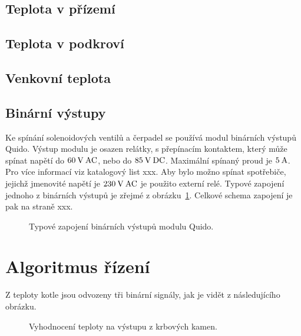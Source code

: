 \documentclass[a4paper,draft]{book}
\begin{document}
    \section{Teplota v přízemí}

    \section{Teplota v podkroví}

    \section{Venkovní teplota}

    \section{Binární výstupy}

        Ke spínání solenoidových ventilů a čerpadel se používá modul binárních
        výstupů Quido. Výstup modulu je
        osazen relátky, s přepínacím kontaktem, který může spínat napětí do
        $60\rm\:V\:AC$, nebo do $85\rm\:V\:DC$. Maximální spínaný proud je
        $5\rm\:A$. Pro více informací viz katalogový list xxx. Aby bylo možno
        spínat spotřebiče, jejichž jmenovité napětí je $230\rm\:V\:AC$ je
        použito externí relé. Typové zapojení jednoho z binárních výstupů je
        zřejmé z obrázku~\ref{fig:binary-out}. Celkové schema zapojení je pak
        na straně xxx.

        \begin{figure}\centering
            \begin{tikzpicture}
                
            \end{tikzpicture}
            \caption{Typové zapojení binárních výstupů modulu Quido.}
            \label{fig:binary-out}
        \end{figure}

        \cite{da2rs}

    \chapter{Algoritmus řízení}\label{chap:algorithm}

        Z teploty kotle jsou odvozeny tři binární signály, jak je vidět z
        následujícího obrázku.

        \begin{figure}
            \begin{tikzpicture}
                
            \end{tikzpicture}
            \caption{Vyhodnocení teploty na výstupu z krbových kamen.}
        \end{figure}
\end{document}
